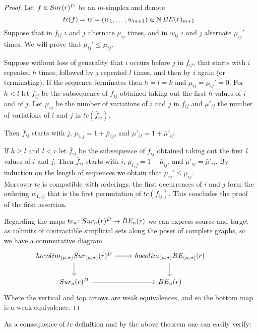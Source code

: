 \begin{proof}
	Let $f\in Sur(r)^{D}$ be an $m$-simplex and denote
	$$tc(f)=w=(w_{1},\dots,w_{m+1})\in \operatorname{N}BE(r)_{m+1}$$
	Suppose that in $f_{ij}$ $i$ and $j$ alternate $\mu_{ij}$ times, and in $w_{ij}$ $i$ and $j$ alternate $\mu_{ij}'$ times.
	We will prove that
	$\mu_{ij}' \leq \mu_{ij}$.

	Suppose without loss of generality that $i$ occurs before $j$ in $f_{ij}$, that starts with $i$ repeated $h$ times, followed by $j$ repeated $l$ times, and
	then by $i$ again (or terminating).
	If the sequence terminates then $h=l=k$ and $\mu_{ij}=\mu_{ij}'=0$.
	For $h <l$
	let $\bar{f}_{ij}$ be the subsequence of $f_{ij}$
	obtained taking out the first $h$ values of $i$ and of $j$.
	Let $\bar{\mu}_{ij}$ be the number of variations of $i$ and $j$ in $\bar{f}_{ij}$
	and $\bar{\mu}'_{ij}$ the number of variations of $i$ and $j$ in $tc(\bar{f}_{ij})$.

	Then $\bar{f}_{ij}$
	starts with $j$,
	$\mu_{i,j}=1+\bar{\mu}_{ij}$,
	and $\mu'_{ij}=1+\bar{\mu}'_{ij}$.

	If $h \geq l$ and $l<r$
	let $\bar{f}_{ij}$ be the subsequence of $f_{ij}$ obtained taking out the first $l$ values of $i$ and $j$.
	Then $\bar{f}_{ij}$
	starts with $i$,
	$\mu_{i,j}=1+\bar{\mu}_{ij}$,
	and $\mu'_{ij}=\bar{\mu}'_{ij}$.
	By induction on the length of sequences we obtain that
	$\mu_{ij}'\le \mu_{ij}$.\\
	Moreover $tc$ is compatible with orderings: the first occurrences of $i$ and $j$ form the ordering $w_{1,ij}$ that is the first permutation of $tc(f_{ij})$.
	This concludes the proof of the first assertion.

	Regarding the maps $\operatorname{tc}_{n} \colon Sur_{n}(r)^{D}\rightarrow BE_{n}(r)$ we can express source and target as colimits of contractible %
	simplicial sets along the poset of complete graphs,
	so we have a commutative diagram
	\begin{equation*}
		\begin{tikzcd}			hocolim_{(\mu,\sigma)}\sur_{(\mu,\sigma)}(r)^{D} \arrow[r] \arrow[d]& hocolim_{(\mu,\sigma)}\BE_{(\mu,\sigma)}(r) \arrow[d] \\
			\sur_{n}(r)^{D}\arrow[r] & \BE_{n}(r)&
		\end{tikzcd}
	\end{equation*}
	Where the vertical and top arrows
	are weak equivalences, and so the bottom map is a weak equivalence.
\end{proof}

As a consequence of $tc$ definition and by the above theorem one can easily verify:

